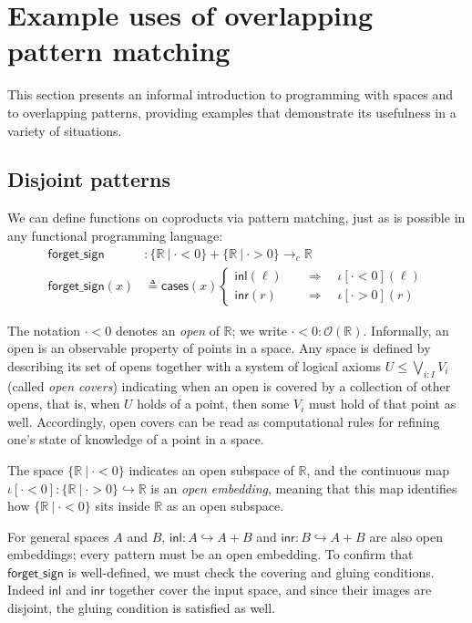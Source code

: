 \documentclass[conference]{IEEEtran}
\newcommand{\hookto}{\hookrightarrow}
\newcommand{\cto}{\to_c}
\newcommand{\R}{\mathbb{R}}
\newcommand{\suchthat}{\ |\ }
\newcommand{\Open}[1]{\mathcal{O}({#1})}
\newcommand{\oinclf}[1]{\iota[{#1}]}
\newcommand{\oincl}[2]{\oinclf{#1} \left({#2}\right)}
\newcommand{\Branch}{\Rightarrow}
\begin{document}
\section{Example uses of overlapping pattern matching}
\label{s:examples}

This section presents an informal introduction to programming with spaces and to overlapping patterns, providing examples that demonstrate its usefulness in a variety of situations.

\subsection{Disjoint patterns}

We can define functions on coproducts via pattern matching, just as is possible in any functional programming language:
\begin{align*}
\mathsf{forget\_sign} &: \{ \R \suchthat \cdot < 0 \} + \{ \R \suchthat \cdot > 0 \} \cto \R
\\ \mathsf{forget\_sign}(x) &\triangleq
  \mathsf{cases}(x)
  \begin{cases}
  \mathsf{inl}(\ell) \quad &\Branch \quad \oincl{\cdot < 0}{\ell}
  \\ \mathsf{inr}(r) \quad &\Branch \quad \oincl{\cdot > 0}{r}
  \end{cases}
\end{align*}

The notation $\cdot < 0$ denotes an \emph{open} of $\R$; we write $\cdot < 0 : \Open{\R}$. Informally, an open is an observable property of points in a space. Any space is defined by describing its set of opens together with a system of logical axioms $U \le \bigvee_{i : I} V_i$ (called \emph{open covers}) indicating when an open is covered by a collection of other opens, that is, when $U$ holds of a point, then some $V_i$ must hold of that point as well. Accordingly, open covers can be read as computational rules for refining one's state of knowledge of a point in a space.

The space $\{ \R \suchthat \cdot < 0 \}$ indicates an open subspace of $\R$, and the continuous map $\oinclf{\cdot < 0} : \{ \R \suchthat \cdot > 0 \} \hookto \R$ is an \emph{open embedding}, meaning that this map identifies how $\{ \R \suchthat \cdot < 0 \}$ sits inside $\R$ as an open subspace.

For general spaces $A$ and $B$, $\mathsf{inl} : A \hookto A + B$ and $\mathsf{inr} : B \hookto A + B$ are also open embeddings; every pattern must be an open embedding. To confirm that $\mathsf{forget\_sign}$ is well-defined, we must check the covering and gluing conditions. Indeed $\mathsf{inl}$ and $\mathsf{inr}$ together cover the input space, and since their images are disjoint, the gluing condition is satisfied as well.
\end{document}
